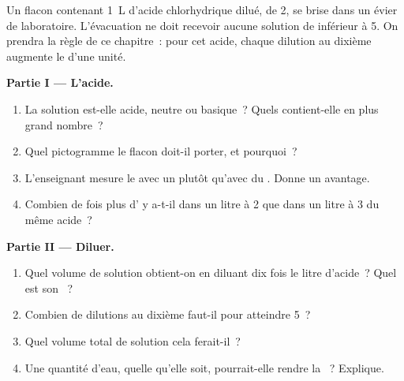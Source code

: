 \begin{problem}
\label{pb:g9:acids-bases-ph:1}
Un flacon contenant \qty{1}{L} d'acide chlorhydrique dilué, de  2,
se brise dans un évier de laboratoire. L'évacuation ne doit recevoir
aucune solution de  inférieur à 5. On prendra la règle de ce
chapitre~: pour cet acide, chaque dilution au dixième augmente le 
d'une unité.

\medskip
\noindent\textbf{Partie I --- L'acide.}
\begin{enumerate}
  \item La solution est-elle acide, neutre ou basique~? Quels 
        contient-elle en plus grand nombre~?
  \item Quel pictogramme le flacon doit-il porter, et pourquoi~?
  \item L'enseignant mesure le  avec un  plutôt qu'avec du
        . Donne un avantage.
  \item Combien de fois plus d'  y a-t-il dans un litre à
         2 que dans un litre à  3 du même acide~?
\end{enumerate}

\medskip
\noindent\textbf{Partie II --- Diluer.}
\begin{enumerate}[resume]
  \item Quel volume de solution obtient-on en diluant dix fois le litre
        d'acide~? Quel est son ~?
  \item Combien de dilutions au dixième faut-il pour atteindre  5~?
  \item Quel volume total de solution cela ferait-il~?
  \item Une quantité d'eau, quelle qu'elle soit, pourrait-elle rendre la
        ~? Explique.
\end{enumerate}


\end{problem}

